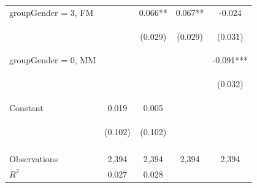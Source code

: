 \documentclass{article} %
\begin{document}
\begin{table}[H]
\begin{center}
\begin{tabular}{lcccc}
groupGender = 3, FM &  & 0.066** & 0.067** & -0.024 \\
\vspace{4pt} & \begin{footnotesize}\end{footnotesize} & \begin{footnotesize}(0.029)\end{footnotesize} & \begin{footnotesize}(0.029)\end{footnotesize} & \begin{footnotesize}(0.031)\end{footnotesize} \\
groupGender = 0, MM &  &  &  & -0.091*** \\
\vspace{4pt} & \begin{footnotesize}\end{footnotesize} & \begin{footnotesize}\end{footnotesize} & \begin{footnotesize}\end{footnotesize} & \begin{footnotesize}(0.032)\end{footnotesize} \\
Constant & 0.019 & 0.005 &  &  \\
 & \begin{footnotesize}(0.102)\end{footnotesize} & \begin{footnotesize}(0.102)\end{footnotesize} & \begin{footnotesize}\end{footnotesize} & \begin{footnotesize}\end{footnotesize} \\
\vspace{4pt} & \begin{footnotesize}\end{footnotesize} & \begin{footnotesize}\end{footnotesize} & \begin{footnotesize}\end{footnotesize} & \begin{footnotesize}\end{footnotesize} \\
Observations & 2,394 & 2,394 & 2,394 & 2,394 \\
 $R^2$ & 0.027 & 0.028 &  &  \\ \hline\hline
 

\end{tabular}
\end{center}
\end{table}
\end{document}

